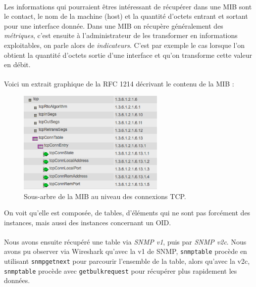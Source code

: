 \documentclass[12pt,a4paper,notitlepage]{article}
\begin{document}
\paragraph{}Les informations qui pourraient êtres intéressant de récupérer dans une MIB sont le contact, le nom de la machine (host) et la quantité d'octets entrant et sortant pour une interface donnée. Dans une MIB on récupère généralement des \textit{métriques}, c'est ensuite à l'administrateur de les transformer en informations exploitables, on parle alors de \textit{indicateurs}. C'est par exemple le cas lorsque l'on obtient la quantité d'octets sortie d'une interface et qu'on transforme cette valeur en débit.

\paragraph{}Voici un extrait graphique de la RFC 1214 décrivant le contenu de la MIB :

\begin{figure}[!h]
\begin{center}
\includegraphics[height=5cm]{rfc1214.png}
\caption{Sous-arbre de la MIB au niveau des connexions TCP.}
\label{fig:rfc1214}
\end{center}
\end{figure}

On voit qu'elle est composée, de tables, d'éléments qui ne sont pas forcément des instances, mais aussi des instances concernant un OID.

\paragraph{}Nous avons ensuite récupéré une table via \textit{SNMP v1}, puis par \textit{SNMP v2c}. Nous avons pu observer via Wireshark qu'avec la v1 de SNMP, \texttt{snmptable} procède en utilisant \texttt{snmpgetnext} pour parcourir l'ensemble de la table, alors qu'avec la v2c, \texttt{snmptable} procède avec \texttt{getbulkrequest} pour récupérer plus rapidement les données.
\end{document}
